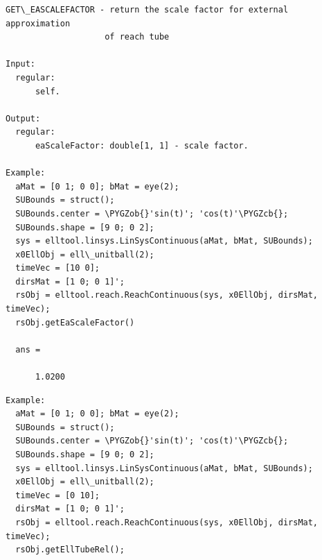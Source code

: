 \documentclass[letterpaper,10pt,english]{sphinxmanual}
\def\PYGZob{\char`\{}
\def\PYGZcb{\char`\}}
\begin{document}
\begin{Verbatim}[commandchars=\\\{\}]
GET\_EASCALEFACTOR - return the scale factor for external approximation
                    of reach tube

Input:
  regular:
      self.

Output:
  regular:
      eaScaleFactor: double[1, 1] - scale factor.

Example:
  aMat = [0 1; 0 0]; bMat = eye(2);
  SUBounds = struct();
  SUBounds.center = \PYGZob{}'sin(t)'; 'cos(t)'\PYGZcb{};
  SUBounds.shape = [9 0; 0 2];
  sys = elltool.linsys.LinSysContinuous(aMat, bMat, SUBounds);
  x0EllObj = ell\_unitball(2);
  timeVec = [10 0];
  dirsMat = [1 0; 0 1]';
  rsObj = elltool.reach.ReachContinuous(sys, x0EllObj, dirsMat, timeVec);
  rsObj.getEaScaleFactor()

  ans =

      1.0200
\end{Verbatim}

\begin{Verbatim}[commandchars=\\\{\}]
Example:
  aMat = [0 1; 0 0]; bMat = eye(2);
  SUBounds = struct();
  SUBounds.center = \PYGZob{}'sin(t)'; 'cos(t)'\PYGZcb{};
  SUBounds.shape = [9 0; 0 2];
  sys = elltool.linsys.LinSysContinuous(aMat, bMat, SUBounds);
  x0EllObj = ell\_unitball(2);
  timeVec = [0 10];
  dirsMat = [1 0; 0 1]';
  rsObj = elltool.reach.ReachContinuous(sys, x0EllObj, dirsMat, timeVec);
  rsObj.getEllTubeRel();
\end{Verbatim}
\end{document}
